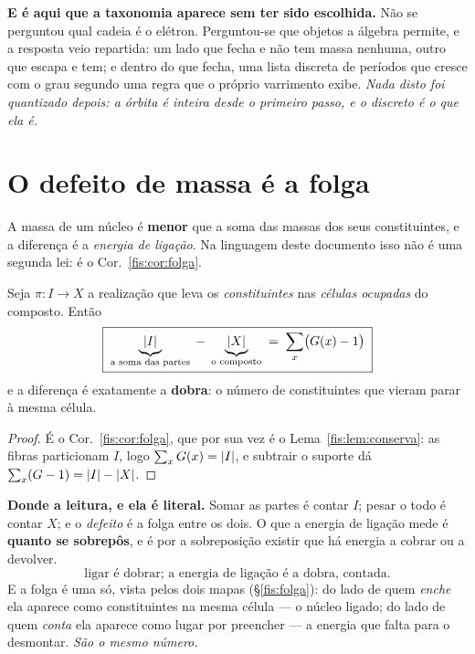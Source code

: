 \documentclass[livro.tex]{subfiles}
\begin{document}
\medskip\noindent\textbf{E é aqui que a taxonomia aparece sem ter sido
escolhida.} Não se perguntou qual cadeia é o elétron. Perguntou-se que objetos a
álgebra permite, e a resposta veio repartida: um lado que fecha e não tem massa
nenhuma, outro que escapa e tem; e dentro do que fecha, uma lista discreta de
períodos que cresce com o grau segundo uma regra que o próprio varrimento exibe.
\emph{Nada disto foi quantizado depois: a órbita é inteira desde o primeiro
passo, e o discreto é o que ela é.}

\section{O defeito de massa é a folga}\label{fis:defeito}

\noindent A massa de um núcleo é \textbf{menor} que a soma das massas dos seus
constituintes, e a diferença é a \emph{energia de ligação}. Na linguagem deste
documento isso não é uma segunda lei: é o Cor.~\ref{fis:cor:folga}.

\begin{teorema}\label{fis:thm:defeito}
Seja $\pi\colon I\to X$ a realização que leva os \emph{constituintes} nas
\emph{células ocupadas} do composto. Então
\[
\boxed{\;\underbrace{\lvert I\rvert}_{\text{a soma das partes}}
\;-\;\underbrace{\lvert X\rvert}_{\text{o composto}}
\;=\;\sum_{x}\bigl(G(x)-1\bigr)\;}
\]
e a diferença é exatamente a \textbf{dobra}: o número de constituintes que
vieram parar à mesma célula.
\end{teorema}

\begin{proof}
É o Cor.~\ref{fis:cor:folga}, que por sua vez é o Lema~\ref{fis:lem:conserva}: as
fibras particionam $I$, logo $\sum_x G(x)=\lvert I\rvert$, e subtrair o suporte dá
$\sum_x(G-1)=\lvert I\rvert-\lvert X\rvert$.
\end{proof}

\medskip\noindent\textbf{Donde a leitura, e ela é literal.} Somar as partes é
contar $I$; pesar o todo é contar $X$; e o \emph{defeito} é a folga entre os
dois. O que a energia de ligação mede é \textbf{quanto se sobrepôs}, e é por a
sobreposição existir que há energia a cobrar ou a devolver.
\[
\boxed{\;\text{ligar é dobrar; a energia de ligação é a dobra, contada.}\;}
\]
E a folga é uma só, vista pelos dois mapas (§\ref{fis:folga}): do lado de quem
\emph{enche} ela aparece como constituintes na mesma célula --- o núcleo ligado;
do lado de quem \emph{conta} ela aparece como lugar por preencher --- a energia
que falta para o desmontar. \emph{São o mesmo número.}
\end{document}
